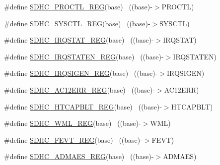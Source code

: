 \begin{DoxyCompactItemize}
\#define \hyperlink{group___s_d_h_c___register___accessor___macros_gaef9e707dc5cec701ae1c34b766590cc2}{S\+D\+H\+C\+\_\+\+P\+R\+O\+C\+T\+L\+\_\+\+R\+EG}(base)                                    ~((base)-\/$>$P\+R\+O\+C\+TL)
\item 
\#define \hyperlink{group___s_d_h_c___register___accessor___macros_ga77c048b22d2a1a655a1973af9241ba59}{S\+D\+H\+C\+\_\+\+S\+Y\+S\+C\+T\+L\+\_\+\+R\+EG}(base)                                    ~((base)-\/$>$S\+Y\+S\+C\+TL)
\item 
\#define \hyperlink{group___s_d_h_c___register___accessor___macros_ga13509728d6cd94b3c4ec554aae8b62c3}{S\+D\+H\+C\+\_\+\+I\+R\+Q\+S\+T\+A\+T\+\_\+\+R\+EG}(base)                                  ~((base)-\/$>$I\+R\+Q\+S\+T\+AT)
\item 
\#define \hyperlink{group___s_d_h_c___register___accessor___macros_ga1f18fa74de2e67064a677032f2fea791}{S\+D\+H\+C\+\_\+\+I\+R\+Q\+S\+T\+A\+T\+E\+N\+\_\+\+R\+EG}(base)                              ~((base)-\/$>$I\+R\+Q\+S\+T\+A\+T\+EN)
\item 
\#define \hyperlink{group___s_d_h_c___register___accessor___macros_ga6fbc0953522e136b24401f4a068c132a}{S\+D\+H\+C\+\_\+\+I\+R\+Q\+S\+I\+G\+E\+N\+\_\+\+R\+EG}(base)                                ~((base)-\/$>$I\+R\+Q\+S\+I\+G\+EN)
\item 
\#define \hyperlink{group___s_d_h_c___register___accessor___macros_ga56d37151a36eb2336bf5018e20649d1b}{S\+D\+H\+C\+\_\+\+A\+C12\+E\+R\+R\+\_\+\+R\+EG}(base)                                  ~((base)-\/$>$A\+C12\+E\+RR)
\item 
\#define \hyperlink{group___s_d_h_c___register___accessor___macros_gace7cb34c06d08883a5fcc5e09b5fef2e}{S\+D\+H\+C\+\_\+\+H\+T\+C\+A\+P\+B\+L\+T\+\_\+\+R\+EG}(base)                                ~((base)-\/$>$H\+T\+C\+A\+P\+B\+LT)
\item 
\#define \hyperlink{group___s_d_h_c___register___accessor___macros_ga0de53147f91ba1d4d621071009e52543}{S\+D\+H\+C\+\_\+\+W\+M\+L\+\_\+\+R\+EG}(base)                                          ~((base)-\/$>$W\+ML)
\item 
\#define \hyperlink{group___s_d_h_c___register___accessor___macros_ga4cb98ec5c899da9be7c700ec54537a05}{S\+D\+H\+C\+\_\+\+F\+E\+V\+T\+\_\+\+R\+EG}(base)                                        ~((base)-\/$>$F\+E\+VT)
\item 
\#define \hyperlink{group___s_d_h_c___register___accessor___macros_gab2958cbf71492c8796d3a6d6393d633a}{S\+D\+H\+C\+\_\+\+A\+D\+M\+A\+E\+S\+\_\+\+R\+EG}(base)                                    ~((base)-\/$>$A\+D\+M\+A\+ES)

\end{DoxyCompactItemize}

